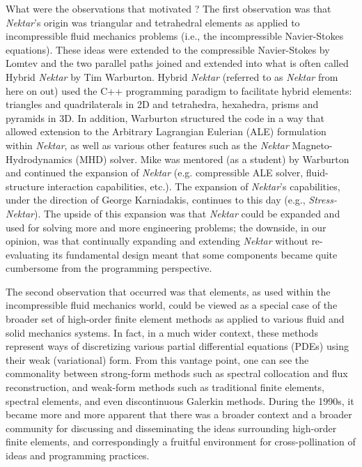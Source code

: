 What were the observations that motivated \nek{}?  The first observation was that \emph{Nektar}'s origin
was triangular and tetrahedral \shp{} elements as applied to incompressible fluid mechanics 
problems (i.e., the incompressible Navier-Stokes equations).  These ideas were extended to 
the compressible Navier-Stokes by Lomtev and the two parallel paths joined and extended into
what is often called Hybrid \emph{Nektar} by Tim Warburton. Hybrid \emph{Nektar} (referred to as \emph{Nektar} from
here on out) used the C++ programming paradigm to facilitate hybrid elements:  triangles and
quadrilaterals in 2D and tetrahedra, hexahedra, prisms and pyramids in 3D.   In addition, Warburton
structured the code in a way that allowed extension to the Arbitrary Lagrangian Eulerian (ALE) formulation
within \emph{Nektar}, as well as various other features such as the \emph{Nektar} Magneto-Hydrodynamics (MHD) solver.
Mike was mentored (as a student) by Warburton and continued the expansion of \emph{Nektar} (e.g. compressible
ALE solver, fluid-structure interaction capabilities, etc.).  The expansion of \emph{Nektar}'s capabilities, under
the direction of George Karniadakis, continues to this day (e.g., \emph{Stress-Nektar}).
The upside of this expansion was that \emph{Nektar} could
be expanded and used for solving more and more engineering problems; the downside, in our opinion, 
was that continually expanding and extending
\emph{Nektar} without re-evaluating its fundamental design meant that some components became quite 
cumbersome from the programming perspective.  

The second observation that occurred was that \shp{} elements, as used within the incompressible
fluid mechanics world, could be viewed as a special case of the broader set of high-order finite element methods
as applied to various fluid and solid mechanics systems.  In fact, in a much wider context, these methods
represent ways of discretizing various partial differential equations (PDEs) using their weak (variational) form.
From this vantage point, one can see the commonality between strong-form methods such as spectral collocation
and flux reconstruction, and weak-form methods such as traditional finite elements, spectral elements, and
even discontinuous Galerkin methods.  
During the 1990s, it became more and more apparent that there was a broader context and a broader
community for discussing and disseminating the ideas surrounding high-order finite elements, and 
correspondingly a fruitful environment for cross-pollination of ideas and programming practices.

